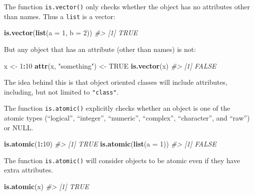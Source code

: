 \documentclass[]{book}
\newenvironment{Shaded}{\begin{snugshade}}{\end{snugshade}}
\newcommand{\CommentTok}[1]{\textcolor[rgb]{0.56,0.35,0.01}{\textit{#1}}}
\newcommand{\DataTypeTok}[1]{\textcolor[rgb]{0.13,0.29,0.53}{#1}}
\newcommand{\DecValTok}[1]{\textcolor[rgb]{0.00,0.00,0.81}{#1}}
\newcommand{\KeywordTok}[1]{\textcolor[rgb]{0.13,0.29,0.53}{\textbf{#1}}}
\newcommand{\NormalTok}[1]{#1}
\newcommand{\OperatorTok}[1]{\textcolor[rgb]{0.81,0.36,0.00}{\textbf{#1}}}
\newcommand{\OtherTok}[1]{\textcolor[rgb]{0.56,0.35,0.01}{#1}}
\newcommand{\StringTok}[1]{\textcolor[rgb]{0.31,0.60,0.02}{#1}}
\theoremstyle{plain}
\theoremstyle{remark}
\theoremstyle{definition}
\theoremstyle{definition}
\theoremstyle{definition}
\theoremstyle{remark}
\begin{document}
The function \texttt{is.vector()} only checks whether the object has no
attributes other than names. Thus a \texttt{list} is a vector:

\begin{Shaded}
\begin{Highlighting}[]
\KeywordTok{is.vector}\NormalTok{(}\KeywordTok{list}\NormalTok{(}\DataTypeTok{a =} \DecValTok{1}\NormalTok{, }\DataTypeTok{b =} \DecValTok{2}\NormalTok{))}
\CommentTok{#> [1] TRUE}
\end{Highlighting}
\end{Shaded}

But any object that has an attribute (other than names) is not:

\begin{Shaded}
\begin{Highlighting}[]
\NormalTok{x <-}\StringTok{ }\DecValTok{1}\OperatorTok{:}\DecValTok{10}
\KeywordTok{attr}\NormalTok{(x, }\StringTok{"something"}\NormalTok{) <-}\StringTok{ }\OtherTok{TRUE}
\KeywordTok{is.vector}\NormalTok{(x)}
\CommentTok{#> [1] FALSE}
\end{Highlighting}
\end{Shaded}

The idea behind this is that object oriented classes will include
attributes, including, but not limited to \texttt{"class"}.

The function \texttt{is.atomic()} explicitly checks whether an object is
one of the atomic types (``logical'', ``integer'', ``numeric'',
``complex'', ``character'', and ``raw'') or NULL.

\begin{Shaded}
\begin{Highlighting}[]
\KeywordTok{is.atomic}\NormalTok{(}\DecValTok{1}\OperatorTok{:}\DecValTok{10}\NormalTok{)}
\CommentTok{#> [1] TRUE}
\KeywordTok{is.atomic}\NormalTok{(}\KeywordTok{list}\NormalTok{(}\DataTypeTok{a =} \DecValTok{1}\NormalTok{))}
\CommentTok{#> [1] FALSE}
\end{Highlighting}
\end{Shaded}

The function \texttt{is.atomic()} will consider objects to be atomic
even if they have extra attributes.

\begin{Shaded}
\begin{Highlighting}[]
\KeywordTok{is.atomic}\NormalTok{(x)}
\CommentTok{#> [1] TRUE}
\end{Highlighting}
\end{Shaded}
\end{document}
